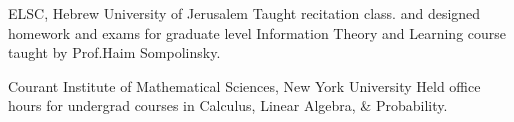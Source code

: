 {}
{ELSC, Hebrew University of Jerusalem}
{Taught recitation class. and designed homework and exams for graduate level Information Theory and Learning course taught by Prof.Haim Sompolinsky.}

{}
{Courant Institute of Mathematical Sciences, New York University}
{Held office hours for undergrad courses in Calculus, Linear Algebra, \& Probability.}
%
%

